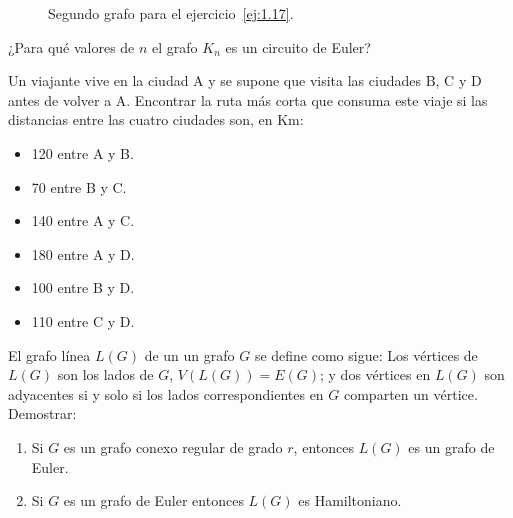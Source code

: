 \begin{ejercicio}
\begin{figure}
        
        
        \caption{Segundo grafo para el ejercicio~\ref{ej:1.17}.}
        \label{fig:1.17_2}
    \end{figure}
\end{ejercicio}

\begin{ejercicio}\label{ej:1.18}
    ¿Para qué valores de $n$ el grafo $K_n$ es un circuito de Euler?
\end{ejercicio}

\begin{ejercicio}\label{ej:1.19}
    Un viajante vive en la ciudad A y se supone que visita las ciudades B, C y D antes de volver a A. Encontrar la ruta más corta que consuma este viaje si las distancias entre las cuatro ciudades son, en Km:
    \begin{itemize}
        \item 120 entre A y B.
        \item 70 entre B y C.
        \item 140 entre A y C.
        \item 180 entre A y D.
        \item 100 entre B y D.
        \item 110 entre C y D.
    \end{itemize}
\end{ejercicio}

\begin{ejercicio}\label{ej:1.20}
    El grafo línea $L(G)$ de un un grafo $G$ se define como sigue: Los vértices de $L(G)$ son los lados de $G$, $V(L(G)) = E(G)$; y dos vértices en $L(G)$ son adyacentes si y solo si los lados correspondientes en $G$ comparten un vértice. Demostrar:
    \begin{enumerate}
        \item Si $G$ es un grafo conexo regular de grado $r$, entonces $L(G)$ es un grafo de Euler.
        \item Si $G$ es un grafo de Euler entonces $L(G)$ es Hamiltoniano.
    \end{enumerate}
\end{ejercicio}


